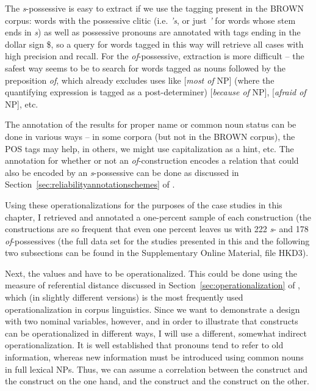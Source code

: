 The \textit{s}-possessive is easy to extract if we use the tagging  present in the BROWN  corpus: words with the possessive clitic  (i.e. \textit{'s}, or just \textit{'} for words whose stem  ends in \textit{s}) as well as possessive pronouns  are annotated  with tags ending in the dollar sign \$, so a query  for words tagged in this way will retrieve  all cases with high precision  and recall.  For the \textit{of}-possessive,  extraction  is more difficult -- the safest way seems to be to search for words tagged  as nouns  followed by the preposition  \textit{of}, which already excludes uses like [\textit{most of} NP] (where the quantifying expression is tagged as a post\hyp{}determiner)  [\textit{because of} NP], [\textit{afraid of} NP], etc.

The annotation  of the results for proper name or common noun status can be done in various ways -- in some corpora (but not in the BROWN  corpus), the POS tags may help, in others, we might use capitalization as a hint, etc. The annotation for whether or not an \textit{of}-construction encodes a relation that could also be encoded by an \textit{s}-possessive  can be done as discussed in Section~\ref{sec:reliabilityannotationschemes} of .

Using these operationalizations  for the purposes of the case studies in this chapter, I retrieved  and annotated  a one\hyp{}percent sample of each construction (the constructions are so frequent that even one percent leaves us with 222 \textit{s}- and 178 \textit{of}-possessives  (the full data set for the studies presented in this and the following two subsections can be found in the Supplementary Online Material, file HKD3).

Next, the values  and  have to be operationalized.  This could be done using the measure  of referential distance  discussed in Section~\ref{sec:operationalization} of , which (in slightly different versions) is the most frequently used operationalization in corpus linguistics. Since we want to demonstrate a design  with two nominal  variables, however, and in order to illustrate that constructs can be operationalized in different ways, I will use a different, somewhat indirect operationalization. It is well established that pronouns  tend to refer to old information, whereas new information must be introduced using common nouns  in full lexical NPs. Thus, we can assume a correlation  between the construct  and the construct   on the one hand, and the construct  and the construct  on the other.

